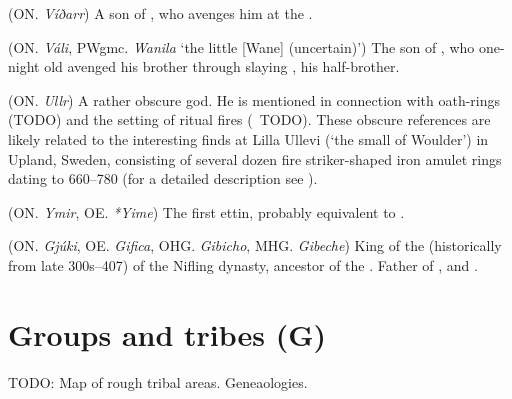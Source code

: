 \begin{itemize}
 (ON. \emph{Víðarr})
  A son of , who avenges him at the .

 (ON. \emph{Váli}, PWgmc. \emph{Wanila} ‘the little [Wane] (uncertain)’)
  The son of , who one-night old avenged his brother  through slaying , his half-brother.

 (ON. \emph{Ullr})
  A rather obscure god. He is mentioned in connection with oath-rings (TODO) and the setting of ritual fires (\Grimnismal\ TODO). These obscure references are likely related to the interesting finds at Lilla Ullevi (‘the small  of Woulder’) in Upland, Sweden, consisting of several dozen fire striker-shaped iron amulet rings dating to 660–780 (for a detailed description see \parencite{afEdholm2009}).

 (ON. \emph{Ymir}, OE. \emph{*Yime})
  The first ettin, probably equivalent to .

 (ON. \emph{Gjúki}, OE. \emph{Gifica}, OHG. \emph{Gibicho}, MHG. \emph{Gibeche})
  King of the  (historically from late 300s–407) of the Nifling dynasty, ancestor of the . Father of ,  and .

\end{itemize}


\section{Groups and tribes (G)}

TODO: Map of rough tribal areas. Geneaologies.


